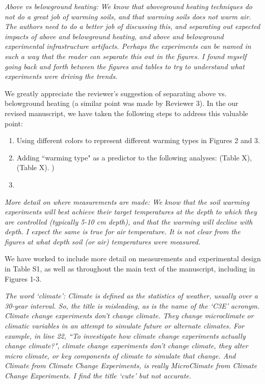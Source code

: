 \documentclass[11pt,a4paper]{letter}
\begin{document}
\par \emph{Above vs belowground heating:  We know that aboveground heating techniques do not do a great job of warming soils, and that warming soils does not warm air. The authors need to do a better job of discussing this, and separating out expected impacts of above and belowground heating, and above and belowground experimental infrastructure artifacts.  Perhaps the experiments can be named in such a way that the reader can separate this out in the figures. I found myself going back and forth between the figures and tables to try to understand what experiments were driving the trends.} 
\par 
We greatly appreciate the reviewer's suggestion of separating above vs. belowground heating (a similar point was made by Reviewer 3). In the our revised manuscript, we have taken the following steps to address this valuable point:
\begin{enumerate}
\item Using different colors  to represent different warming types in Figures 2 and 3.
\item Adding ``warming type" as a predictor to the following analyses: (Table X), (Table X). )
\item 
\end{enumerate}

\par \emph{More detail on where measurements are made:  We know that the soil warming experiments will best achieve their target temperatures at the depth to which they are controlled (typically 5-10 cm depth), and that the warming will decline with depth.  I expect the same is true for air temperature. It is not clear from the figures at what depth soil (or air) temperatures were measured.}
\par We have worked to include more detail on measurements and experimental design in Table S1, as well as throughout the main text of the manuscript, including in Figures 1-3.

\par \emph{The word `climate': Climate is defined as the statistics of weather, usually over a 30-year interval. So, the title is misleading, as is the name of the `C3E' acronym.  Climate change experiments don't change climate.  They change microclimate or climatic variables in an attempt to simulate future or alternate climates.  For example, in line 22, ``To investigate how climate change experiments actually change climate?", climate change experiments don't change climate, they alter micro climate, or key components of climate to simulate that change.  And Climate from Climate Change Experiments, is really MicroClimate from Climate Change Experiments. I find the title `cute' but not accurate.}
\end{document}
